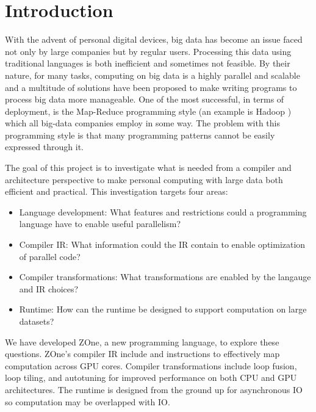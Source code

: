 \section*{Introduction}

With the advent of personal digital devices, big data has become an
issue faced not only by large companies but by regular users. Processing
this data using traditional languages is both inefficient and sometimes
not feasible. By their nature, for many tasks, computing on big data is
a highly parallel and scalable and a multitude of solutions have been
proposed to make writing programs to process big data more manageable.
One of the most successful, in terms of deployment, is the
Map-Reduce\cite{MapReduce} programming style (an example is Hadoop
\cite{Hadoop}) which
all big-data companies employ in some way. The problem with this
programming style is that many programming patterns cannot be easily
expressed through it.

The goal of this project is to investigate what is needed from a compiler and
architecture perspective to make personal computing with large data both
efficient and practical. This investigation targets four areas:
\begin{itemize}
\item Language development: What features and restrictions could a
      programming language have to enable useful parallelism?
\item Compiler IR: What information could the IR contain to enable
      optimization of parallel code?
\item Compiler transformations: What transformations are enabled by
      the langauge and IR choices?
\item Runtime: How can the runtime be designed to support computation
      on large datasets?
\end{itemize}

We have developed ZOne, a new programming language, to explore
these questions. ZOne's compiler IR include  and 
 instructions to effectively map computation across
GPU cores. Compiler transformations include loop fusion,
loop tiling, and autotuning for improved performance on both CPU
and GPU architectures. The runtime is designed from the ground up
for asynchronous IO so computation may be overlapped with IO.
